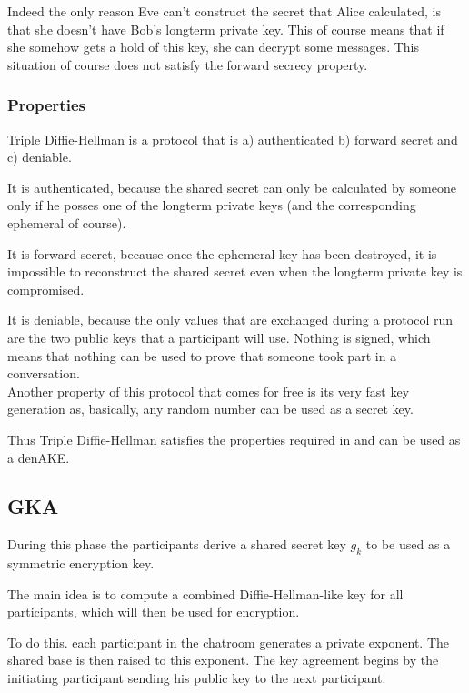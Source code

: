 \documentclass[12pt,titlepage,a4paper]{article}
\begin{document}
{Indeed the only reason Eve can't construct the secret that Alice calculated, is
that she doesn't have Bob's longterm private key. This of course means that if
she somehow gets a hold of this key, she can decrypt some messages. This situation
of course does not satisfy the forward secrecy property.


\subsubsection{Properties}

Triple Diffie-Hellman is a protocol that is a) authenticated b) forward secret
and c) deniable.

It is authenticated, because the shared secret can only be calculated by someone
only if he posses one of the longterm private keys (and the corresponding ephemeral
of course).

It is forward secret, because once the ephemeral key has been destroyed, it is
impossible to reconstruct the shared secret even when the longterm
private key is compromised.

It is deniable, because the only values that are exchanged during a protocol run
are the two public keys that a participant will use. Nothing is signed, which means
that nothing can be used to prove that someone took part in a conversation.\\[0.5cm]

Another property of this protocol that comes for free is its very fast key generation
as, basically, any random number can be used as a secret key.

Thus Triple Diffie-Hellman satisfies the properties required in \cite{mpotr} and
can be used as a denAKE.


\subsection{GKA}

During this phase the participants derive a shared secret key $g_k$ to be used
as a symmetric encryption key.

The main idea is to compute a combined Diffie-Hellman-like key for all
participants, which will then be used for encryption.

To do this. each participant in the chatroom generates a private exponent.
The shared base is then raised to this exponent. The key agreement begins
by the initiating participant sending his public key to the next participant.

}
\end{document}
